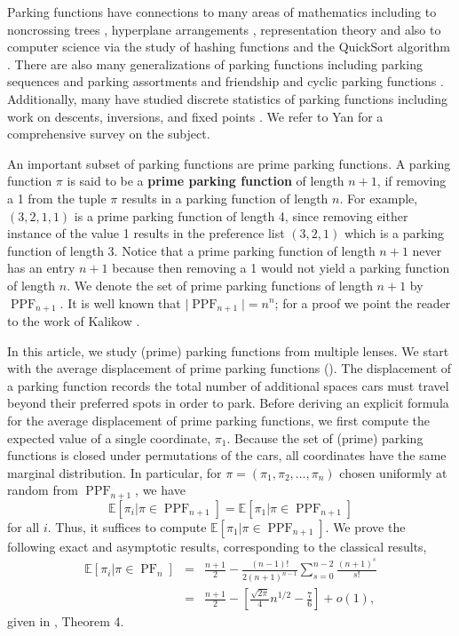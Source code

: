 \documentclass[12pt,reqno]{amsart}
\theoremstyle{definition}
\newcommand{\E}{\mathbb{E}}
\theoremstyle{remark}
\DeclareMathOperator{\PF}{PF}
\DeclareMathOperator{\PPF}{PPF}
\newcommand{\defterm}{\textbf}
\begin{document}
Parking functions have connections to many areas of mathematics including to noncrossing trees \cite{BrusselSprouts}, hyperplane arrangements \cite{hyperplanes},  representation theory \cite{Steph} and also to computer science via the study of hashing functions \cite{konheimWeiss} and the QuickSort algorithm \cite{quicksort}.   
There are also many generalizations of parking functions including parking sequences and parking assortments \cite{sequencesassortments} and friendship and cyclic parking functions \cite{friendship}. 
Additionally, many have studied discrete statistics of parking functions including work on descents, inversions, and fixed points \cite{pfstats,inversions,fixedpoints}.
We refer to Yan \cite{yan2015parking} for a comprehensive survey on the subject.




An important subset of parking functions are prime parking functions.
A parking function $\pi$ is said to be a \defterm{prime parking function} of length $n+1$, if removing a 1 from the tuple $\pi$ results in a parking function of length $n$. For example, $(3,2,1,1)$ is a prime parking function of length 4, since removing either instance of the value 1 results in the preference list $(3,2,1)$ which is a parking function of length 3. 
 Notice that a prime parking function of length $n+1$ never has an entry $n+1$ because then removing a 1 would not yield a parking function of length $n$.
We denote the set of prime
parking functions of length $n+1$ by $\PPF_{n+1}$. It is well known that $\vert \PPF_{n+1} \vert=n^{n}$; for a proof we point the reader to the work of Kalikow \cite[pp.~141-142]{Stanley}.



In this article, we study (prime) parking functions from multiple lenses. We start with the average displacement of prime parking functions (). The displacement of a parking function records the total number of additional spaces cars must travel beyond their preferred spots in order to park. Before deriving an explicit formula for the average displacement of prime parking functions, we first compute the expected value of a single coordinate, $\pi_1$. Because the set of (prime) parking functions is closed under permutations of the cars, all coordinates have the same marginal distribution. In particular, for $\pi=(\pi_1,\pi_2,\ldots, \pi_n)$ chosen uniformly at random from $\PPF_{n+1}$, we have
$$\E[\pi_i | \pi \in \PPF_{n+1}]= \E [\pi_1 | \pi \in \PPF_{n+1}]$$
for all $i$. Thus, it suffices to compute $\E[\pi_1 | \pi \in \PPF_{n+1}]$. We prove the following exact and asymptotic results, corresponding to the classical results, 
\begin{eqnarray*}
    \E[\pi_i|\pi\in \PF_n]&=&\frac{n+1}{2}-\frac{(n-1)!}{2(n+1)^{n-1}}\sum_{s=0}^{n-2}\frac{(n+1)^s}{s!}\\
    &=&\frac{n+1}{2}-\left[\frac{\sqrt{2\pi}}{4}n^{1/2}-\frac{7}{6}\right]+o(1),
\end{eqnarray*}
given in \cite{durmic2022probabilistic}, Theorem 4.
\end{document}
